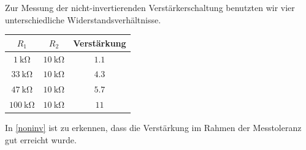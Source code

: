 Zur Messung der nicht-invertierenden Verstärkerschaltung benutzten wir vier
unterschiedliche Widerstandsverhältnisse. 
\begin{center}
\begin{tabular}{c c c}
\hline
$R_1$ &$R_2$ &Verstärkung \\ \hline
$\SI{1}{\kilo \ohm}$ &$\SI{10}{\kilo\ohm}$ &$1.1$ \\
$\SI{33}{\kilo\ohm}$ &$\SI{10}{\kilo\ohm}$ &$4.3$ \\
$\SI{47}{\kilo\ohm}$ &$\SI{10}{\kilo\ohm}$ &$5.7$ \\
$\SI{100}{\kilo\ohm}$ &$\SI{10}{\kilo\ohm}$ &$11$ \\
\hline
\end{tabular}
\end{center}
In \ref{noninv} ist zu erkennen, dass die Verstärkung im Rahmen der Messtoleranz
gut erreicht wurde.
